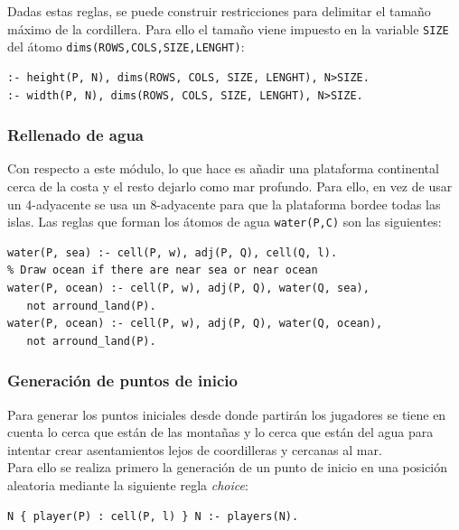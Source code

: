 \hspace{1em}

Dadas estas reglas, se puede construir restricciones para delimitar el tamaño máximo de la cordillera. Para ello el tamaño viene impuesto en la variable \texttt{SIZE} del átomo \texttt{dims(ROWS,COLS,SIZE,LENGHT)}: \\

\begin{lstlisting}[label=lst:msizeforbidden]
:- height(P, N), dims(ROWS, COLS, SIZE, LENGHT), N>SIZE.
:- width(P, N), dims(ROWS, COLS, SIZE, LENGHT), N>SIZE.
\end{lstlisting}

\subsubsection{Rellenado de agua}

Con respecto a este módulo, lo que hace es añadir una plataforma continental cerca de la costa y el resto dejarlo como mar profundo. Para ello, en vez de usar un 4-adyacente se usa un 8-adyacente para que la plataforma bordee todas las islas. Las reglas que forman los átomos de agua \texttt{water(P,C)} son las siguientes: \\

\begin{lstlisting}[label=lst:water]
% Draw sea if there are near land
water(P, sea) :- cell(P, w), adj(P, Q), cell(Q, l).
% Draw ocean if there are near sea or near ocean
water(P, ocean) :- cell(P, w), adj(P, Q), water(Q, sea),
   not arround_land(P).
water(P, ocean) :- cell(P, w), adj(P, Q), water(Q, ocean),
   not arround_land(P).
\end{lstlisting}

\subsubsection{Generación de puntos de inicio}

Para generar los puntos iniciales desde donde partirán los jugadores se tiene en cuenta lo cerca que están de las montañas y lo cerca que están del agua para intentar crear asentamientos lejos de coordilleras y cercanas al mar. \\

Para ello se realiza primero la generación de un punto de inicio en una posición aleatoria mediante la siguiente regla \textit{choice}: \\

\begin{lstlisting}[label=lst:water]
N { player(P) : cell(P, l) } N :- players(N).
\end{lstlisting}


